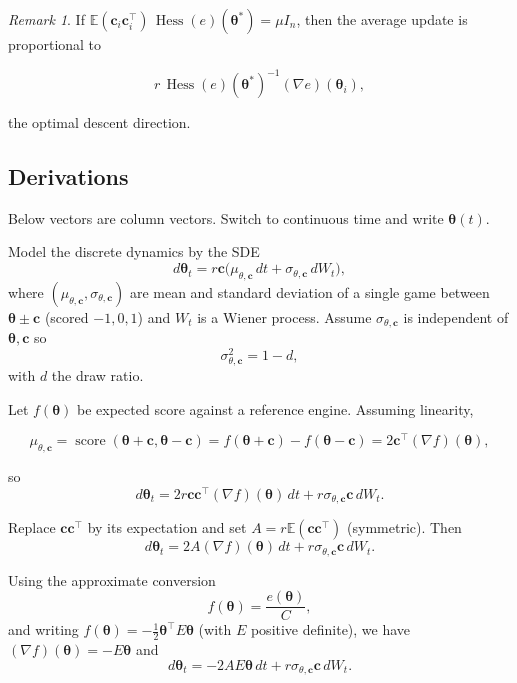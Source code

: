 \documentclass[11pt]{article}
\theoremstyle{plain}
\theoremstyle{definition}
\theoremstyle{remark}
\newtheorem{remark}{Remark}
\newcommand{\E}{\mathbb{E}}
\DeclareMathOperator{\Hess}{Hess}
\DeclareMathOperator{\score}{score}
\begin{document}
\begin{remark}
If $\E(\bm{c}_i\bm{c}_i^\top)\,\Hess(e)(\bm{\theta}^\ast)=\mu I_n$, then the
average update is proportional to

\[
  r\,\Hess(e)(\bm{\theta}^\ast)^{-1}(\nabla e)(\bm{\theta}_i),
\]

the optimal descent direction.
\end{remark}

\subsection{Derivations}

Below vectors are column vectors. Switch to continuous time and write
$\bm{\theta}(t)$.

Model the discrete dynamics by the SDE
\begin{equation}
  d\bm{\theta}_t = r\bm{c}\bigl(\mu_{\theta,\bm{c}}\,dt + \sigma_{\theta,\bm{c}}\,dW_t\bigr),
\end{equation}
where $(\mu_{\theta,\bm{c}},\sigma_{\theta,\bm{c}})$ are mean and standard
deviation of a single game between $\bm{\theta}\pm\bm{c}$ (scored $-1,0,1$)
and $W_t$ is a Wiener process. Assume $\sigma_{\theta,\bm{c}}$ is independent
of $\bm{\theta},\bm{c}$ so
\begin{equation}
  \sigma_{\theta,\bm{c}}^2 = 1-d,
  \label{eq:sigma}
\end{equation}
with $d$ the draw ratio.

Let $f(\bm{\theta})$ be expected score against a reference engine. Assuming
linearity,

\[
  \mu_{\theta,\bm{c}} = \score(\bm{\theta}+\bm{c},\bm{\theta}-\bm{c})
  = f(\bm{\theta}+\bm{c})-f(\bm{\theta}-\bm{c}) = 2\bm{c}^\top(\nabla f)(\bm{\theta}),
\]

so
\begin{equation}
  d\bm{\theta}_t = 2r\bm{c}\bm{c}^\top(\nabla f)(\bm{\theta})\,dt + r\sigma_{\theta,\bm{c}}\bm{c}\,dW_t.
\end{equation}

Replace $\bm{c}\bm{c}^\top$ by its expectation and set
$A=r\E(\bm{c}\bm{c}^\top)$ (symmetric). Then
\begin{equation}
  d\bm{\theta}_t = 2A(\nabla f)(\bm{\theta})\,dt + r\sigma_{\theta,\bm{c}}\bm{c}\,dW_t.
\end{equation}

Using the approximate conversion
\begin{equation}
  f(\bm{\theta})=\frac{e(\bm{\theta})}{C},
  \label{eq:f-e}
\end{equation}
and writing $f(\bm{\theta})=-\tfrac12\bm{\theta}^\top E\bm{\theta}$ (with $E$ positive definite), we have $(\nabla f)(\bm{\theta})=-E\bm{\theta}$ and
\begin{equation}
  d\bm{\theta}_t = -2AE\bm{\theta}\,dt + r\sigma_{\theta,\bm{c}}\bm{c}\,dW_t.
\end{equation}
\end{document}
